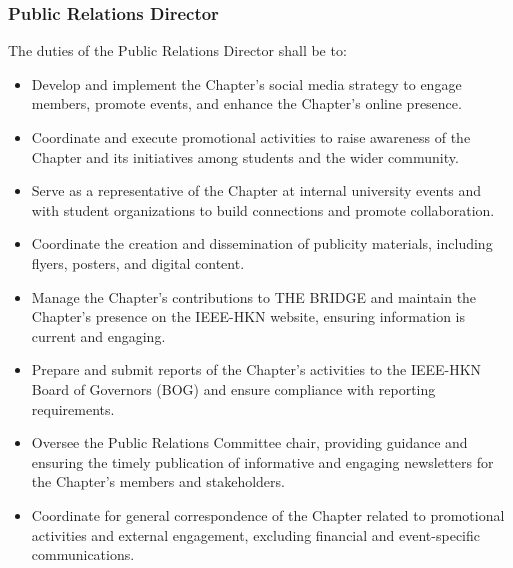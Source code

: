 \documentclass[10pt, oneside]{article}
\begin{document}
\subsubsection{Public Relations Director}
The duties of the Public Relations Director shall be to:
\begin{itemize}
    \item Develop and implement the Chapter's social media strategy to engage members, promote events, and enhance the Chapter's online presence.
    \item Coordinate and execute promotional activities to raise awareness of the Chapter and its initiatives among students and the wider community.
    \item Serve as a representative of the Chapter at internal university events and with student organizations to build connections and promote collaboration.
    \item Coordinate the creation and dissemination of publicity materials, including flyers, posters, and digital content.
    \item Manage the Chapter's contributions to THE BRIDGE and maintain the Chapter's presence on the IEEE-HKN website, ensuring information is current and engaging.
    \item Prepare and submit reports of the Chapter’s activities to the IEEE-HKN Board of Governors (BOG) and ensure compliance with reporting requirements.
    \item Oversee the Public Relations Committee chair, providing guidance and ensuring the timely publication of informative and engaging newsletters for the Chapter's members and stakeholders.
    \item Coordinate for general correspondence of the Chapter related to promotional activities and external engagement, excluding financial and event-specific communications.
\end{itemize}
\end{document}
